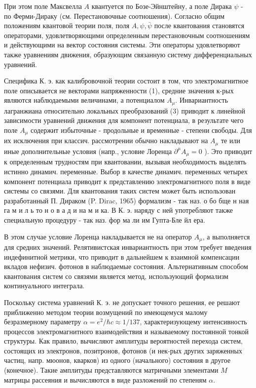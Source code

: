 \documentclass[10pt]{article}
\begin{document}
При этом поле Максвелла $A$ квантуется по Бозе-Эйнштейну, а поле Дирака $\psi$ - по Ферми-Дираку (см. Перестановочные соотношения). Согласно общим положениям квантовой теории поля, поля $A, \psi, \bar{\psi}$ после квантования становятся операторами, удовлетворяющими определенным перестановочным соотношениям и действующими на вектор состояния системы. Эти операторы удовлетворяют также уравнениям движения, образующим связанную систему дифференциальных уравнений.



Специфика К. э. как калибровочной теории состоит в том, что электромагнитное поле описывается не векторами напряженности (1), средние значения к-рых являются наблюдаемыми величинами, а потенциалом $A_{\mu}$. Инвариантность лагранжиана относительно локальных преобразований (3) приводит к линейной зависимости уравнений движения для компонент потенциала, в результате чего поле $A_{\mu}$ содержит избыточные - продольные и временные - степени свободы. Для их исключения при классич. рассмотрении обычно накладывают на $A_{\mu}$ те или иные дополнительные условия (напр., условие Лоренца $\partial^{\mu} A_{\mu}=0$ ). Это приводит к определенным трудностям при квантовании, вызывая необходимость выделять истинно динамич. переменные. Выбор в качестве динамич. переменных четырех компонент потенциала приводит к представлению электромагнитного поля в виде системы со связями. Для квантования таких систем может быть использован разработанный П. Дираком (P. Dirac, 1965) формализм - так наз. о бо бще н ная га м и л ь то н о в а д и на м и ка. В К. э. наряду с ней употребляют также специальную процедуру - так наз. фор ма ли им Гупта-Бле йл ера.



В этом случае условие Лоренца накладывается не на оператор $A_{\mu}$, а выполняется для средних значений. Релятивистская инвариантность при этом требует введения индефинитной метрики, что приводит в дальнейшем к взаимной компенсации вкладов нефизич. фотонов в наблюдаемые состояния. Альтернативным способом квантования систем со связями является метод, использующий формализм континуального интеграла.



Поскольку система уравнений К. э. не допускает точного решения, ее решают приближенно методом теории возмущений по имеющемуся малому безразмерному параметру $\alpha=e^{2} / \hbar c \approx 1 / 137$, характеризующему интенсивность процессов электромагнитного взаимодействия и называемому постоянной тонкой структуры. Как правило, вычисляют амплитуды вероятностей перехода систем, состоящих из электронов, позитронов, фотонов (и нек-рых других заряженных частиц, напр. мюонов, кварков) из одного (начального) состояния в другое (конечное). Такие амплитуды представляются матричными элементами $M$ матрицы рассеяния и вычисляются в виде разложений по степеням $\alpha$.
\end{document}
